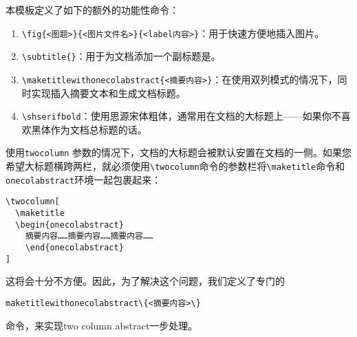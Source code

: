 本模板定义了如下的额外的功能性命令：

\begin{enumerate}
    \item \texttt{\textbackslash fig\{<图题>\}\{<图片文件名>\}\{<label内容>\}}：用于快速方便地插入图片。
    \item \texttt{\textbackslash subtitle\{\}}：用于为文档添加一个副标题是。
    \item \texttt{\textbackslash maketitlewithonecolabstract\{<摘要内容>\}}：在使用双列模式的情况下，同时实现插入摘要文本和生成文档标题。
    \item \texttt{\textbackslash shserifbold}：使用思源宋体粗体，通常用在文档的大标题上——如果你不喜欢黑体作为文档总标题的话。
\end{enumerate}

\begin{remark}
  使用\texttt{twocolumn} 参数的情况下，文档的大标题会被默认安置在文档的一侧。如果您希望大标题横跨两栏，就必须使用\texttt{\textbackslash twocolumn}命令的参数栏将\texttt{\textbackslash maketitle}命令和\texttt{onecolabstract}环境一起包裹起来：

\begin{verbatim}
\twocolumn[
  \maketitle
  \begin{onecolabstract}
    摘要内容……摘要内容……摘要内容……
    \end{onecolabstract}
]
\end{verbatim}

  这将会十分不方便。因此，为了解决这个问题，我们定义了专门的
\begin{verbatim}
maketitlewithonecolabstract\{<摘要内容>\}
\end{verbatim}
  命令，来实现two column abstract一步处理。
\end{remark}